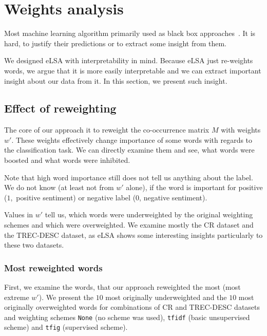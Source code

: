 \section{Weights analysis} \label{chap:weight:analysis}

    Most machine learning algorithm primarily used as black box approaches~\cite{ribeiro2016should}. %
    It is hard, to justify their predictions or to extract some insight from them. 
    
    We designed eLSA with interpretability in mind.
    Because eLSA just re-weights words, we argue that it is more easily interpretable and we can extract important insight about our data from it.
    In this section, we present such insight.
    
    \subsection{Effect of reweighting}
    The core of our approach it to reweight the co-occurrence matrix $M$ with weights $w'$. 
    These weights effectively change importance of some words with regards to the classification task.
    We can directly examine them and see, what words were boosted and what words were inhibited.
    
    Note that high word importance still does not tell us anything about the label. 
    We do not know (at least not from $w'$ alone), if the word is important for positive ($1$,~positive sentiment) or negative label ($0$, negative sentiment).
    
    Values in $w'$ tell us, which words were underweighted by the original weighting schemes and which were overweighted.
    We examine mostly the CR dataset and the TREC-DESC dataset, as eLSA shows some interesting insights particularly to these two datasets.

    \subsubsection{Most reweighted words}
    
    First, we examine the words, that our approach reweighted the most (most extreme $w'$).
    We present the $10$ most originally underweighted and the $10$ most originally overweighted words for combinations of CR and TREC-DESC datasets and weighting schemes \texttt{None} (no scheme was used), \texttt{tfidf} (basic unsupervised scheme) and \texttt{tfig} (supervised scheme).
    

